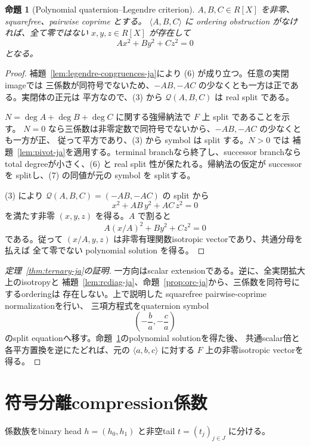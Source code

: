 \documentclass[uplatex,dvipdfmx]{jsarticle}
\newtheorem{proposition}[theorem]{命題}
\theoremstyle{definition}
\theoremstyle{remark}
\begin{document}
\begin{proposition}[Polynomial quaternion--Legendre criterion]\label{prop:legendre-ja}
$A,B,C\in R[X]$ を非零、squarefree、pairwise coprime とする。
$\langle A,B,C\rangle$ に ordering obstruction がなければ、全て零ではない
$x,y,z\in R[X]$ が存在して
\[
  Ax^2+By^2+Cz^2=0
\]
となる。
\end{proposition}

\begin{proof}
補題~\ref{lem:legendre-congruences-ja}により (6) が成り立つ。任意の実閉imageでは
三係数が同符号でないため、$-AB,-AC$ の少なくとも一方は正である。実閉体の正元は
平方なので、(3) から $\mathcal Q(A,B,C)$ は real split である。

$N=\deg A+\deg B+\deg C$ に関する強帰納法で $F$ 上 split であることを示す。
$N=0$ なら三係数は非零定数で同符号でないから、$-AB,-AC$ の少なくとも一方が正、
従って平方であり、(3) から symbol は split する。$N>0$ では
補題~\ref{lem:pivot-ja}を適用する。terminal branchなら終了し、successor branchなら
total degreeが小さく、(6) と real split 性が保たれる。帰納法の仮定が successor を
splitし、(7) の同値が元の symbol を splitする。

(3) により $\mathcal Q(A,B,C)=(-AB,-AC)$ の split から
\[
  x^2+AB\,y^2+AC\,z^2=0
\]
を満たす非零 $(x,y,z)$ を得る。$A$ で割ると
\[
  A(x/A)^2+B y^2+C z^2=0
\]
である。従って $(x/A,y,z)$ は非零有理関数isotropic vectorであり、共通分母を払えば
全て零でない polynomial solution を得る。
\end{proof}

\begin{proof}[定理~\ref{thm:ternary-ja}の証明]
一方向はscalar extensionである。逆に、全実閉拡大上のisotropyと
補題~\ref{lem:rcdiag-ja}、命題~\ref{prop:orc-ja}から、三係数を同符号にするorderingは
存在しない。上で説明した squarefree pairwise-coprime normalizationを行い、
三項方程式をquaternion symbol
\[
  \left(-\frac ba,-\frac ca\right)
\]
のsplit equationへ移す。命題~\ref{prop:legendre-ja}のpolynomial solutionを得た後、
共通scalar倍と各平方置換を逆にたどれば、元の $\langle a,b,c\rangle$ に対する
$F$ 上の非零isotropic vectorを得る。
\end{proof}

\section{符号分離compression係数}

係数族をbinary head $h=(h_0,h_1)$ と非空tail $t=(t_j)_{j\in J}$ に分ける。
\end{document}
